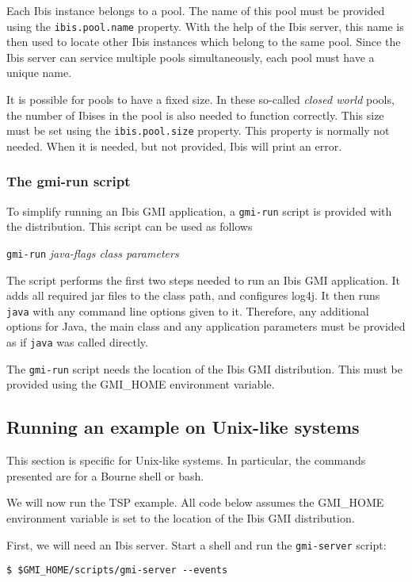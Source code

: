 \documentclass[a4paper,10pt]{article}
\begin{document}
Each Ibis instance belongs to a pool. The name of this pool must be provided
using the \texttt{ibis.pool.name} property. With the help of the Ibis server,
this name is then used to locate other Ibis instances which belong to the
same pool. Since the Ibis server can service multiple pools simultaneously,
each pool must have a unique name.

It is possible for pools to have a fixed size. In these so-called \emph{closed
world} pools, the number of Ibises in the pool is also needed to function
correctly. This size must be set using the \texttt{ibis.pool.size} property.
This property is normally not needed. When it is needed, but not provided, Ibis
will print an error. 

\subsubsection{The gmi-run script}

To simplify running an Ibis GMI application, a \texttt{gmi-run} script is
provided with the distribution. This script can be
used as follows

\begin{center}
\texttt{gmi-run} \emph{java-flags class parameters}
\end{center}

The script performs the first two steps needed to run an Ibis GMI application.
It adds all required jar files
to the class path, and configures log4j.
It then runs \texttt{java} with any
command line options given to it. Therefore, any additional options for
Java, the main class and any application parameters must be provided as
if \texttt{java} was called directly.

The \texttt{gmi-run} script needs the location of the Ibis GMI
distribution. This must be provided using the GMI\_HOME environment
variable.

\subsection{Running an example on Unix-like systems}

This section is specific for Unix-like systems. In particular, the
commands presented are for a Bourne shell or bash.

We will now run the TSP example. All code below assumes the GMI\_HOME
environment variable is set to the location of the Ibis GMI distribution.

First, we will need an Ibis server. Start a shell and
run the \texttt{gmi-server} script:
\noindent
{\small
\begin{verbatim}
$ $GMI_HOME/scripts/gmi-server --events
\end{verbatim}
}
\noindent
\end{document}
